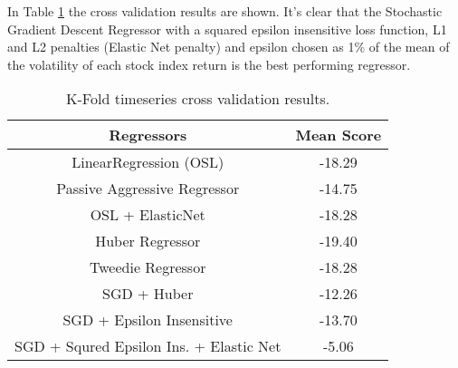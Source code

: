 In Table \ref{tab:crossval-results} the cross validation results are shown. It's clear that the Stochastic Gradient Descent Regressor with a squared epsilon insensitive loss function, L1 and L2 penalties (Elastic Net penalty) and epsilon chosen as 1\% of the mean of the volatility of each stock index return is the best performing regressor.

\begin{table}[]
	\centering
	\begin{tabular}{|c|c|}
		\hline
		\textbf{Regressors}                     & \textbf{Mean Score} \\ \hline
		LinearRegression (OSL)                  & -18.29              \\ \hline
		Passive Aggressive Regressor            & -14.75              \\ \hline
		OSL + ElasticNet                        & -18.28              \\ \hline
		Huber Regressor                         & -19.40              \\ \hline
		Tweedie Regressor                       & -18.28              \\ \hline
		SGD + Huber                             & -12.26              \\ \hline
		SGD + Epsilon Insensitive               & -13.70              \\ \hline
		SGD + Squred Epsilon Ins. + Elastic Net & -5.06               \\ \hline
	\end{tabular}
	\caption{K-Fold timeseries cross validation results.}
	\label{tab:crossval-results}
\end{table}

